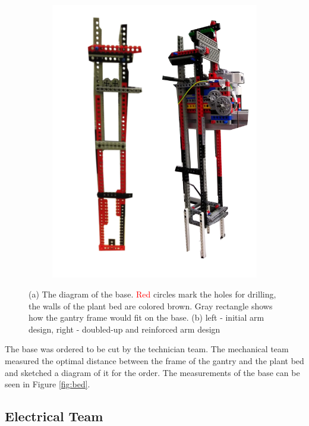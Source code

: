 \documentclass{article}
\begin{document}
\begin{figure}[h]
{\begin{subfigure}[b]{0.35\columnwidth}
    \centerline{\includegraphics[width=\linewidth]{figs-demo2/p.png}}
    \subcaption{}
    \label{fig:arms}
\end{subfigure}
}

\caption{(a) The diagram of the base. \textcolor{red}{Red} circles mark the holes for drilling, the walls of the plant bed are colored \textcolor{mybrown}{brown}. \textcolor{mygray}{Gray} rectangle shows how the gantry frame would fit on the base.
(b) left - initial arm design, right - doubled-up and reinforced arm design}

\vskip -5mm
\end{figure}


The base was ordered to be cut by the technician team. The mechanical team measured the optimal distance between the frame of the gantry and the plant bed and sketched a diagram of it for the order. The measurements of the base can be seen in Figure \ref{fig:bed}.

\subsection{Electrical Team}
\end{document}
